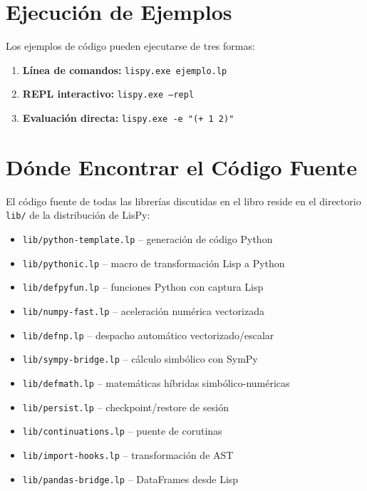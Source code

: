\section{Ejecución de Ejemplos}

Los ejemplos de código pueden ejecutarse de tres formas:

\begin{enumerate}
\item \textbf{Línea de comandos:} \texttt{lispy.exe ejemplo.lp}
\item \textbf{REPL interactivo:} \texttt{lispy.exe --repl}
\item \textbf{Evaluación directa:} \texttt{lispy.exe -e "(+ 1 2)"}
\end{enumerate}

\section{Dónde Encontrar el Código Fuente}

El código fuente de todas las librerías discutidas en el libro reside en el
directorio \texttt{lib/} de la distribución de LisPy:

\begin{itemize}
\item \texttt{lib/python-template.lp} -- generación de código Python
\item \texttt{lib/pythonic.lp} -- macro de transformación Lisp a Python
\item \texttt{lib/defpyfun.lp} -- funciones Python con captura Lisp
\item \texttt{lib/numpy-fast.lp} -- aceleración numérica vectorizada
\item \texttt{lib/defnp.lp} -- despacho automático vectorizado/escalar
\item \texttt{lib/sympy-bridge.lp} -- cálculo simbólico con SymPy
\item \texttt{lib/defmath.lp} -- matemáticas híbridas simbólico-numéricas
\item \texttt{lib/persist.lp} -- checkpoint/restore de sesión
\item \texttt{lib/continuations.lp} -- puente de corutinas
\item \texttt{lib/import-hooks.lp} -- transformación de AST
\item \texttt{lib/pandas-bridge.lp} -- DataFrames desde Lisp
\end{itemize}
